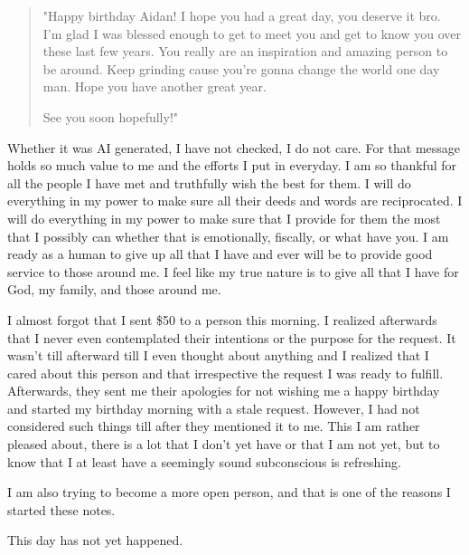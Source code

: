 \begin{quote}
"Happy birthday Aidan! I hope you had a great day, you deserve it bro. I'm glad I was blessed enough to get to meet you and get to know you over these last few years. You really are an inspiration and amazing person to be around. Keep grinding cause you're gonna change the world one day man. Hope you have another great year.

See you soon hopefully!"
\end{quote}

\noindent
Whether it was AI generated, I have not checked, I do not care. For that message holds so much value to me and the efforts I put in everyday. I am so thankful for all the people I have met and truthfully wish the best for them. I will do everything in my power to make sure all their deeds and words are reciprocated. I will do everything in my power to make sure that I provide for them the most that I possibly can whether that is emotionally, fiscally, or what have you. I am ready as a human to give up all that I have and ever will be to provide good service to those around me. I feel like my true nature is to give all that I have for God, my family, and those around me.

\medskip\noindent
I almost forgot that I sent \$50 to a person this morning. I realized afterwards that I never even contemplated their intentions or the purpose for the request. It wasn't till afterward till I even thought about anything and I realized that I cared about this person and that irrespective the request I was ready to fulfill. Afterwards, they sent me their apologies for not wishing me a happy birthday and started my birthday morning with a stale request. However, I had not considered such things till after they mentioned it to me. This I am rather pleased about, there is a lot that I don't yet have or that I am not yet, but to know that I at least have a seemingly sound subconscious is refreshing.

\medskip\noindent
I am also trying to become a more open person, and that is one of the reasons I started these notes.

\noindent
This day has not yet happened.

